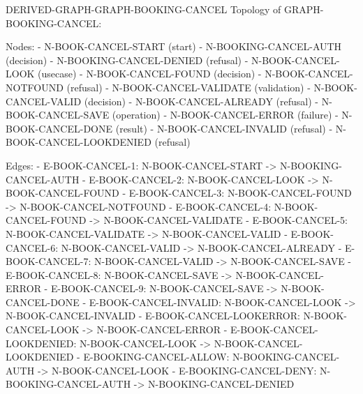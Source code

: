 \documentclass[11pt,a4paper]{article}
\begin{document}
\par\noindent\begin{minipage}{\linewidth}
\begin{atlasderived}{DERIVED-GRAPH-GRAPH-BOOKING-CANCEL}
Topology of GRAPH-BOOKING-CANCEL:

Nodes:
- N-BOOK-CANCEL-START (start)
- N-BOOKING-CANCEL-AUTH (decision)
- N-BOOKING-CANCEL-DENIED (refusal)
- N-BOOK-CANCEL-LOOK (use\AtlasCharUnderscore{}case)
- N-BOOK-CANCEL-FOUND (decision)
- N-BOOK-CANCEL-NOTFOUND (refusal)
- N-BOOK-CANCEL-VALIDATE (validation)
- N-BOOK-CANCEL-VALID (decision)
- N-BOOK-CANCEL-ALREADY (refusal)
- N-BOOK-CANCEL-SAVE (operation)
- N-BOOK-CANCEL-ERROR (failure)
- N-BOOK-CANCEL-DONE (result)
- N-BOOK-CANCEL-INVALID (refusal)
- N-BOOK-CANCEL-LOOKDENIED (refusal)

Edges:
- E-BOOK-CANCEL-1: N-BOOK-CANCEL-START -> N-BOOKING-CANCEL-AUTH
- E-BOOK-CANCEL-2: N-BOOK-CANCEL-LOOK -> N-BOOK-CANCEL-FOUND
- E-BOOK-CANCEL-3: N-BOOK-CANCEL-FOUND -> N-BOOK-CANCEL-NOTFOUND
- E-BOOK-CANCEL-4: N-BOOK-CANCEL-FOUND -> N-BOOK-CANCEL-VALIDATE
- E-BOOK-CANCEL-5: N-BOOK-CANCEL-VALIDATE -> N-BOOK-CANCEL-VALID
- E-BOOK-CANCEL-6: N-BOOK-CANCEL-VALID -> N-BOOK-CANCEL-ALREADY
- E-BOOK-CANCEL-7: N-BOOK-CANCEL-VALID -> N-BOOK-CANCEL-SAVE
- E-BOOK-CANCEL-8: N-BOOK-CANCEL-SAVE -> N-BOOK-CANCEL-ERROR
- E-BOOK-CANCEL-9: N-BOOK-CANCEL-SAVE -> N-BOOK-CANCEL-DONE
- E-BOOK-CANCEL-INVALID: N-BOOK-CANCEL-LOOK -> N-BOOK-CANCEL-INVALID
- E-BOOK-CANCEL-LOOKERROR: N-BOOK-CANCEL-LOOK -> N-BOOK-CANCEL-ERROR
- E-BOOK-CANCEL-LOOKDENIED: N-BOOK-CANCEL-LOOK -> N-BOOK-CANCEL-LOOKDENIED
- E-BOOKING-CANCEL-ALLOW: N-BOOKING-CANCEL-AUTH -> N-BOOK-CANCEL-LOOK
- E-BOOKING-CANCEL-DENY: N-BOOKING-CANCEL-AUTH -> N-BOOKING-CANCEL-DENIED
\end{atlasderived}
\end{minipage}\par
\clearpage
{}\par
{}\par
\end{document}
